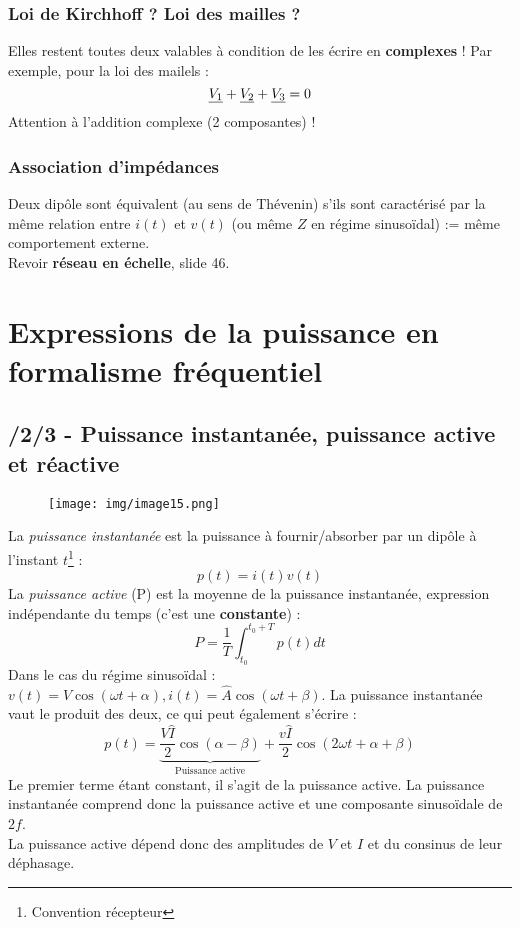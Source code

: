 \documentclass[11pt, a4paper, openany]{book}
\begin{document}
		\subsubsection{Loi de Kirchhoff ? Loi des mailles ?}
		Elles restent toutes deux valables à condition de les écrire en \textbf{complexes} ! Par exemple, pour la loi des mailels :
		\begin{equation}
		\phas{V_1} + \phas{V_2} + \phas{V_3} = 0
		\end{equation}
		Attention à l'addition complexe (2 composantes) !
		
		\subsubsection{Association d'impédances}
		Deux dipôle sont équivalent (au sens de Thévenin) s'ils sont caractérisé par la même relation entre $i(t)$ et $v(t)$ (ou même $Z$ en régime sinusoïdal) := même comportement externe.\\
		Revoir \textbf{réseau en échelle}, slide 46.
		
		\section{Expressions de la puissance en formalisme fréquentiel}
		\subsection{/2/3 - Puissance instantanée, puissance active et réactive}
		\begin{wrapfigure}[7]{l}{4.7cm}
			\texttt{[image: img/image15.png]}
		\end{wrapfigure}
		La \textit{puissance instantanée} est la puissance à fournir/absorber par un dipôle à l'instant $t$\footnote{Convention récepteur} :
		\begin{equation}
		p(t) = i(t)v(t)
		\end{equation}
		La \textit{puissance active} (P) est la moyenne de la puissance instantanée, expression indépendante du temps (c'est une \textbf{constante}) :
		\begin{equation}
		P = \frac{1}{T}\int_{t_0}^{t_0+T} p(t) dt
		\end{equation}
		Dans le cas du régime sinusoïdal : $v(t) = V\cos(\omega t + \alpha), i(t) = \hat A\cos(\omega t + \beta)$. La puissance instantanée vaut le produit des deux, ce qui peut également s'écrire :
		\begin{equation}
		p(t) = \underbrace{\frac{V\hat I}{2}\cos(\alpha - \beta)}_{\text{Puissance active}} + \frac{v\hat I}{2}\cos(2\omega t + \alpha + \beta)
		\end{equation}
		Le premier terme étant constant, il s'agit de la puissance active. La puissance instantanée comprend donc la puissance active et une composante sinusoïdale de $2f$.\\
		La puissance active dépend donc des amplitudes de $V$ et $I$ et du consinus de leur déphasage.\\
		
\end{document}

